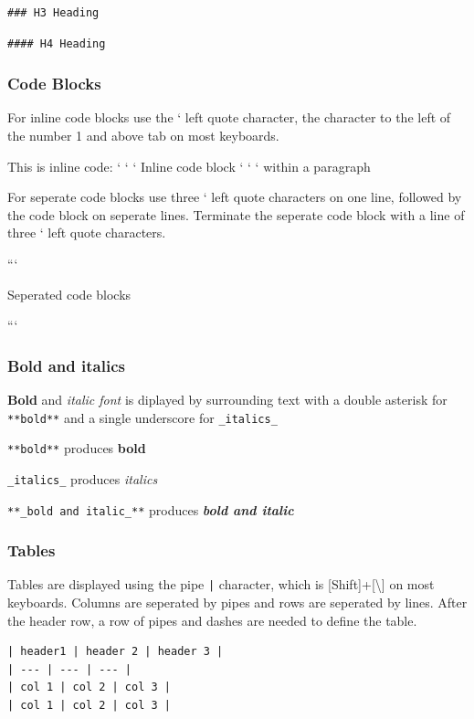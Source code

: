 \documentclass{book}
\begin{document}
\begin{lstlisting}
### H3 Heading
\end{lstlisting}

\begin{lstlisting}
#### H4 Heading
\end{lstlisting}

\subsubsection{Code Blocks}\label{code-blocks}

For inline code blocks use the ` left quote character, the character to
the left of the number 1 and above tab on most keyboards.

This is inline code: ` ` ` Inline code block ` ` ` within a paragraph

For seperate code blocks use three ` left quote characters on one line,
followed by the code block on seperate lines. Terminate the seperate
code block with a line of three ` left quote characters.

```

Seperated code blocks

```

\subsubsection{Bold and italics}\label{bold-and-italics}

\textbf{Bold} and \emph{italic font} is diplayed by surrounding text
with a double asterisk for \lstinline!**bold**! and a single underscore
for \lstinline!_italics_!

\lstinline!**bold**! produces \textbf{bold}

\lstinline!_italics_! produces \emph{italics}

\lstinline!**_bold and italic_**! produces \textbf{\emph{bold and
italic}}

\subsubsection{Tables}\label{tables}

Tables are displayed using the pipe \lstinline!|! character, which is
{[}Shift{]}+{[}\textbackslash{}{]} on most keyboards. Columns are
seperated by pipes and rows are seperated by lines. After the header
row, a row of pipes and dashes are needed to define the table.

\begin{lstlisting}
| header1 | header 2 | header 3 |
| --- | --- | --- |
| col 1 | col 2 | col 3 |
| col 1 | col 2 | col 3 |
\end{lstlisting}
\end{document}

